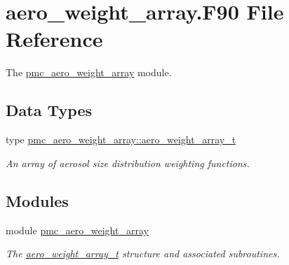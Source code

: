 \hypertarget{aero__weight__array_8_f90}{}\section{aero\+\_\+weight\+\_\+array.\+F90 File Reference}
\label{aero__weight__array_8_f90}


The \mbox{\hyperlink{namespacepmc__aero__weight__array}{pmc\+\_\+aero\+\_\+weight\+\_\+array}} module.  


\subsection*{Data Types}
\begin{DoxyCompactItemize}
\item 
type \mbox{\hyperlink{structpmc__aero__weight__array_1_1aero__weight__array__t}{pmc\+\_\+aero\+\_\+weight\+\_\+array\+::aero\+\_\+weight\+\_\+array\+\_\+t}}
\begin{DoxyCompactList}\small\item\em An array of aerosol size distribution weighting functions. \end{DoxyCompactList}\end{DoxyCompactItemize}
\subsection*{Modules}
\begin{DoxyCompactItemize}
\item 
module \mbox{\hyperlink{namespacepmc__aero__weight__array}{pmc\+\_\+aero\+\_\+weight\+\_\+array}}
\begin{DoxyCompactList}\small\item\em The \mbox{\hyperlink{structpmc__aero__weight__array_1_1aero__weight__array__t}{aero\+\_\+weight\+\_\+array\+\_\+t}} structure and associated subroutines. \end{DoxyCompactList}\end{DoxyCompactItemize}
